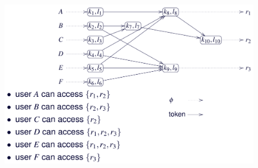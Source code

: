 \documentclass{report}
\begin{document}
\begin{figure}[ht]
    \centering
    \includegraphics[width=1\linewidth]{images/encryption/encryption-policy-graph.png}
\end{figure}
\end{document}
